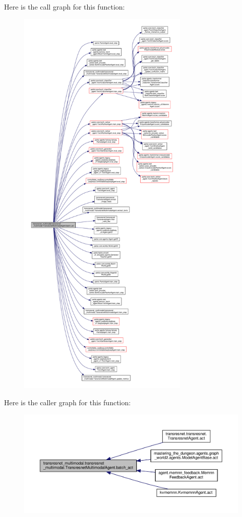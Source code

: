 Here is the call graph for this function\+:
\nopagebreak
\begin{figure}[H]
\begin{center}
\leavevmode
\includegraphics[height=550pt]{classtransresnet__multimodal_1_1transresnet__multimodal_1_1TransresnetMultimodalAgent_a057eb1109f5c2ea467539083e2f7e7f6_cgraph}
\end{center}
\end{figure}
Here is the caller graph for this function\+:
\nopagebreak
\begin{figure}[H]
\begin{center}
\leavevmode
\includegraphics[width=350pt]{classtransresnet__multimodal_1_1transresnet__multimodal_1_1TransresnetMultimodalAgent_a057eb1109f5c2ea467539083e2f7e7f6_icgraph}
\end{center}
\end{figure}
